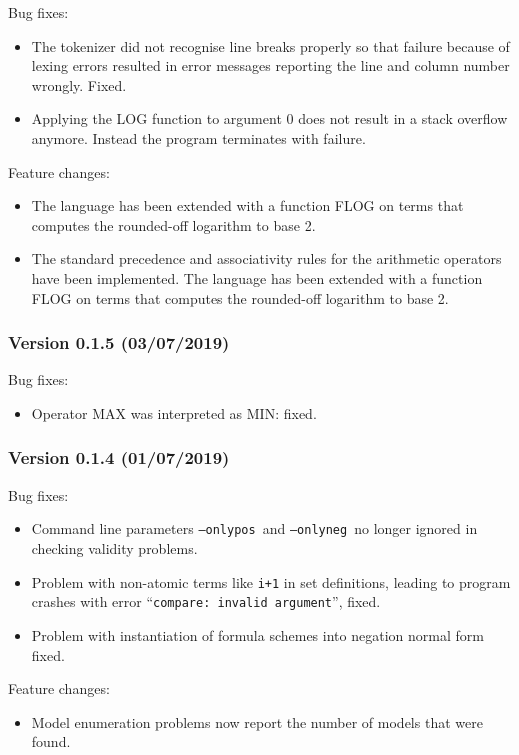 \documentclass[twoside]{article}
\begin{document}
Bug fixes:
\begin{itemize}
\item The tokenizer did not recognise line breaks properly so that failure because of lexing errors resulted in error messages reporting the line and column number wrongly. Fixed.
\item Applying the LOG function to argument 0 does not result in a stack overflow anymore. Instead the program terminates with failure. 
\end{itemize}
Feature changes:
\begin{itemize}
\item The \DiMo language has been extended with a function FLOG on terms that computes the rounded-off logarithm to base 2.
\item The standard precedence and associativity rules for the arithmetic operators have been implemented. The \DiMo language has been extended with a function FLOG on terms that computes the rounded-off logarithm to base 2.
\end{itemize}


\subsubsection*{Version 0.1.5 (03/07/2019)}

Bug fixes:
\begin{itemize}
\item Operator MAX was interpreted as MIN: fixed.
\end{itemize}


\subsubsection*{Version 0.1.4 (01/07/2019)}

Bug fixes:
\begin{itemize}
\item Command line parameters \texttt{--onlypos} and \texttt{--onlyneg} no longer ignored in checking validity problems.
\item Problem with non-atomic terms like \texttt{i+1} in set definitions, leading to program crashes with error ``\texttt{compare: invalid argument}'', fixed.
\item Problem with instantiation of formula schemes into negation normal form fixed.
\end{itemize}
Feature changes:
\begin{itemize}
\item Model enumeration problems now report the number of models that were found.
\end{itemize}
\end{document}
